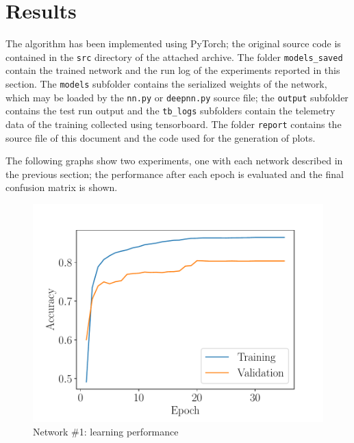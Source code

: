\documentclass[10pt,a4paper,twocolumn]{article}
\begin{document}
\section{Results}

The algorithm has been implemented using PyTorch; the original source code is contained in the \texttt{src} directory of the attached archive.
The folder \texttt{models\_saved} contain the trained network and the run log of the experiments reported in this section. The \texttt{models} subfolder contains the serialized weights of the network, which may be loaded by the \texttt{nn.py} or \texttt{deepnn.py} source file; the \texttt{output} subfolder contains the test run output and the \texttt{tb\_logs} subfolders contain the telemetry data of the training collected using tensorboard.
The folder \texttt{report} contains the source file of this document and the code used for the generation of plots.

The following graphs show two experiments, one with each network described in the previous section; the performance after each epoch is evaluated and the final confusion matrix is shown.

\begin{figure}
    \centering \includegraphics[width=\linewidth]{plot_nn_macc}
    \caption{Network \#1: learning performance}
\end{figure}
\end{document}
